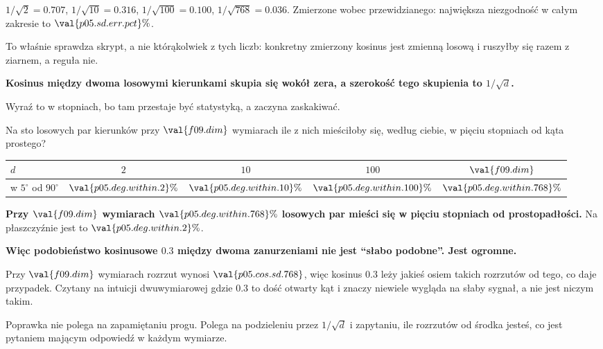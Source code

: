\begin{fr}
$1/\sqrt{2} = \num{0.707}$, $1/\sqrt{10} = \num{0.316}$, $1/\sqrt{100} = \num{0.100}$,
$1/\sqrt{768} = \num{0.036}$. Zmierzone wobec przewidzianego: największa niezgodność
w całym zakresie to $\val{p05.sd.err.pct}\%$.

To właśnie sprawdza skrypt, a nie którąkolwiek z tych liczb: konkretny
zmierzony kosinus jest zmienną losową i ruszyłby się razem z ziarnem, a reguła
nie.

\textbf{Kosinus między dwoma losowymi kierunkami skupia się wokół zera, a
szerokość tego skupienia to $1/\sqrt{d}$.}
\end{fr}

\begin{fr}
Wyraź to w stopniach, bo tam przestaje być statystyką, a zaczyna zaskakiwać.

Na sto losowych par kierunków przy $\val{f09.dim}$ wymiarach ile z nich
mieściłoby się, według ciebie, w pięciu stopniach od kąta prostego?
\dotline
\nextframe
\end{fr}

\begin{fr}
\begin{center}
\begin{tabular}{lcccc}
\toprule
$d$ & $2$ & $10$ & $100$ & $\val{f09.dim}$ \\
\midrule
w $5^{\circ}$ od $90^{\circ}$ & $\val{p05.deg.within.2}\%$ &
  $\val{p05.deg.within.10}\%$ & $\val{p05.deg.within.100}\%$ &
  $\val{p05.deg.within.768}\%$ \\
\bottomrule
\end{tabular}
\end{center}

\textbf{Przy $\val{f09.dim}$ wymiarach $\val{p05.deg.within.768}\%$ losowych
par mieści się w pięciu stopniach od prostopadłości.} Na płaszczyźnie jest to
$\val{p05.deg.within.2}\%$.
\end{fr}


\begin{fr}
\begin{trapbox}
\textbf{Więc podobieństwo kosinusowe $\num{0.3}$ między dwoma zanurzeniami nie jest
\enquote{słabo podobne}. Jest ogromne.}

Przy $\val{f09.dim}$ wymiarach rozrzut wynosi $\val{p05.cos.sd.768}$, więc
kosinus $\num{0.3}$ leży jakieś osiem takich rozrzutów od tego, co daje przypadek.
Czytany na intuicji dwuwymiarowej \dash{} gdzie $\num{0.3}$ to dość otwarty kąt i
znaczy niewiele \dash{} wygląda na słaby sygnał, a nie jest niczym takim.

Poprawka nie polega na zapamiętaniu progu. Polega na podzieleniu przez
$1/\sqrt{d}$ i zapytaniu, ile rozrzutów od środka jesteś, co jest pytaniem
mającym odpowiedź w każdym wymiarze.
\end{trapbox}
\end{fr}

